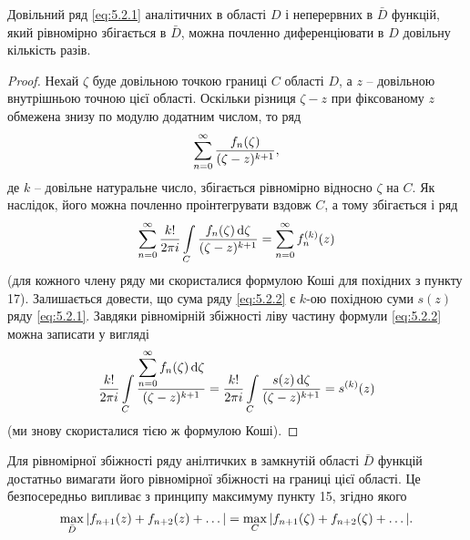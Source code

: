\begin{theorem}
	\label{th:5.2.2}
	Довільний ряд \eqref{eq:5.2.1} аналітичних в області $D$ і неперервних в $\bar D$ функцій, який рівномірно збігається в $\bar D$, можна почленно диференціювати в $D$ довільну кількість разів.
\end{theorem}
\begin{proof}
Нехай $\zeta$ буде довільною точкою границі $C$ області $D$, а $z$ -- довільною внутрішньою точною цієї області. Оскільки різниця $\zeta - z$ при фіксованому $z$ обмежена знизу по модулю додатним числом, то ряд
\begin{equation*}
	\displaystyle\sum\limits_{n = 0}^\infty \frac{f_n(\zeta)}{(\zeta - z)^{k + 1}},
\end{equation*}
де $k$ -- довільне натуральне число, збігається рівномірно відносно $\zeta$ на $C$. Як наслідок, його можна почленно проінтегрувати вздовж $C$, а тому збігається і ряд
\begin{equation}
	\label{eq:5.2.2}
	\displaystyle\sum\limits_{n = 0}^\infty \frac{k!}{2 \pi i} \displaystyle\int\limits_C \frac{f_n(\zeta) \mathop{}\!\mathrm{d} \zeta}{(\zeta - z)^{k + 1}} = \displaystyle\sum\limits_{n = 0}^\infty f_n^{(k)} (z)
\end{equation}
(для кожного члену ряду ми скористалися формулою Коші для похідних з пункту 17). Залишається довести, що сума ряду \eqref{eq:5.2.2} %
є $k$-ою похідною суми $s(z)$ ряду \eqref{eq:5.2.1}. Завдяки рівномірній збіжності ліву частину формули \eqref{eq:5.2.2} %
можна записати у вигляді
\begin{equation*}
	\frac{k!}{2 \pi i} \displaystyle\int\limits_C \frac{\displaystyle\sum\limits_{n = 0}^\infty f_n(\zeta) \mathop{}\!\mathrm{d} \zeta}{(\zeta - z)^{k + 1}} = \frac{k!}{2 \pi i} \displaystyle\int\limits_C \frac{s(z) \mathop{}\!\mathrm{d} \zeta}{(\zeta - z)^{k + 1}} = s^{(k)}(z)
\end{equation*}
(ми знову скористалися тією ж формулою Коші).

\end{proof}

\begin{remark*}
	Для рівномірної збіжності ряду анілтичких в замкнутій області $\bar D$ функцій достатньо вимагати його рівномірної збіжності на границі цієї області. Це безпосередньо випливає з принципу максимуму пункту 15, згідно якого
	\begin{equation*}
		\displaystyle\max\limits_{\bar D} |f_{n + 1}(z) + f_{n + 2}(z) + \ldots | = \displaystyle\max\limits_{C} |f_{n + 1}(\zeta) + f_{n + 2}(\zeta) + \ldots|.
	\end{equation*}
\end{remark*}


